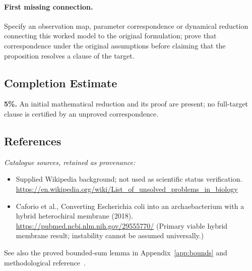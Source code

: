 \documentclass[11pt]{article}
\begin{document}
\paragraph{First missing connection.} Specify an observation map, parameter correspondence or dynamical reduction connecting this worked model to the original formulation; prove that correspondence under the original assumptions before claiming that the proposition resolves a clause of the target.
\subsection{Completion Estimate}
\textbf{5\%.} An initial mathematical reduction and its proof are present; no full-target clause is certified by an unproved correspondence.
\subsection{References}
\noindent\emph{Catalogue sources, retained as provenance:}
\begin{itemize}
\item Supplied Wikipedia background; not used as scientific status verification. \url{https://en.wikipedia.org/wiki/List_of_unsolved_problems_in_biology}
\item Caforio et al., Converting Escherichia coli into an archaebacterium with a hybrid heterochiral membrane (2018). \url{https://pubmed.ncbi.nlm.nih.gov/29555770/} (Primary viable hybrid membrane result; instability cannot be assumed universally.)
\end{itemize}
\noindent See also the proved bounded-sum lemma in Appendix~\ref{app:bounds} and methodological reference~\cite{hoeffding}.
\clearpage


\appendix
\end{document}
